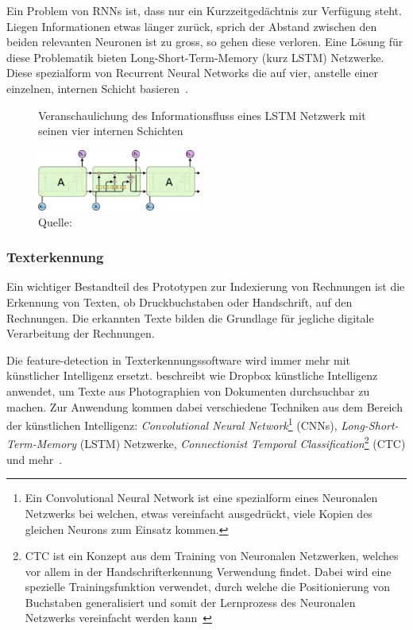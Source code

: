 \documentclass{hwz}
\begin{document}
Ein Problem von RNNs ist, dass nur ein Kurzzeitgedächtnis zur Verfügung steht. Liegen Informationen etwas länger zurück, sprich der Abstand zwischen den beiden relevanten Neuronen ist zu gross, so gehen diese verloren. Eine Lösung für diese Problematik bieten Long-Short-Term-Memory (kurz LSTM) Netzwerke. Diese spezialform von Recurrent Neural Networks die auf vier, anstelle einer einzelnen, internen Schicht basieren~\autocite{Olah2015UnderstandingNetworks}.
\begin{figure}[h]
    \caption{Veranschaulichung des Informationsfluss eines LSTM Netzwerk mit seinen vier internen Schichten}
    \label{lstm1}
    \centering
    \includegraphics[width=0.48\textwidth]{graphics/lstm.png}
    \caption*{Quelle: \textcite{Olah2015UnderstandingNetworks}}
\end{figure}

\subsubsection{Texterkennung}

Ein wichtiger Bestandteil des Prototypen zur Indexierung von Rechnungen ist die Erkennung von Texten, ob Druckbuchstaben oder Handschrift, auf den Rechnungen. Die erkannten Texte bilden die Grundlage für jegliche digitale Verarbeitung der Rechnungen.

Die feature-detection in Texterkennungssoftware wird immer mehr mit künstlicher Intelligenz ersetzt. \textcite{Neuberg2017CreatingLearning} beschreibt wie Dropbox künstliche Intelligenz anwendet, um Texte aus Photographien von Dokumenten durchsuchbar zu machen. Zur Anwendung kommen dabei verschiedene Techniken aus dem Bereich der künstlichen Intelligenz: \textit{Convolutional Neural Network}\footnote{Ein Convolutional Neural Network ist eine spezialform eines Neuronalen Netzwerks bei welchen, etwas vereinfacht ausgedrückt, viele Kopien des gleichen Neurons zum Einsatz kommen\autocite{Olah2014ConvPerspective}.} (CNNs),  \textit{Long-Short-Term-Memory} (LSTM) Netzwerke, \textit{Connectionist Temporal Classification}\footnote{CTC ist ein Konzept aus dem Training von Neuronalen Netzwerken, welches vor allem in der Handschrifterkennung Verwendung findet. Dabei wird eine spezielle Trainingsfunktion verwendet, durch welche die Positionierung von Buchstaben generalisiert und somit der Lernprozess des Neuronalen Netzwerks vereinfacht werden kann~\autocite{Scheidl2018AnClassification}} (CTC) und mehr~\autocite{Neuberg2017CreatingLearning}.
\end{document}
